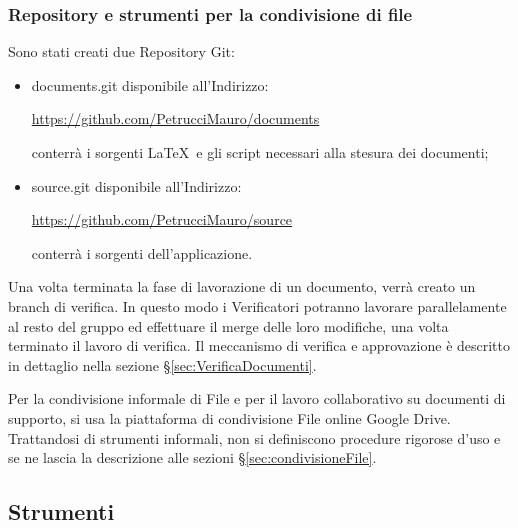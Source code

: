 \subsubsection{Repository e strumenti per la condivisione di file}

Sono stati creati due Repository Git:
\begin{itemize}


\item documents.git disponibile all’Indirizzo:\\
\begin{center}\url{https://github.com/PetrucciMauro/documents}\\\end{center}
conterrà i sorgenti \LaTeX \ e gli script necessari alla stesura dei documenti;
\item source.git disponibile all’Indirizzo:\\
\begin{center}
\url{https://github.com/PetrucciMauro/source}\\
\end{center}
conterrà i sorgenti dell’applicazione.\\
\end{itemize}
Una volta terminata la fase di lavorazione di un documento, verrà creato un branch di verifica. In questo modo i Verificatori potranno lavorare parallelamente al resto del gruppo ed effettuare il merge  delle loro modifiche, una volta terminato il lavoro di verifica.
Il meccanismo di verifica e approvazione è descritto in dettaglio nella sezione \S\ref{sec:VerificaDocumenti}.


Per la condivisione informale di File e per il lavoro collaborativo su documenti di supporto, si usa la piattaforma di condivisione File online Google Drive.
Trattandosi di strumenti informali, non si definiscono procedure rigorose d’uso e se ne lascia la descrizione alle sezioni \S\ref{sec:condivisioneFile}.


\subsection{Strumenti}


